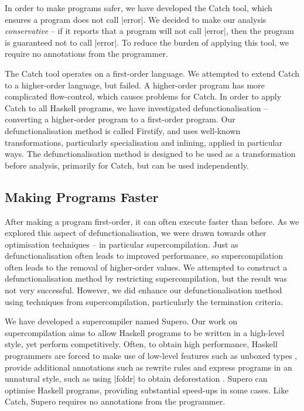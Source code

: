 In order to make programs safer, we have developed the Catch tool, which ensures a program does not call |error|. We decided to make our analysis \textit{conservative} -- if it reports that a program will not call |error|, then the program is guaranteed not to call |error|. To reduce the burden of applying this tool, we require no annotations from the programmer.

The Catch tool operates on a first-order language. We attempted to extend Catch to a higher-order language, but failed. A higher-order program has more complicated flow-control, which causes problems for Catch. In order to apply Catch to all Haskell programs, we have investigated defunctionalisation -- converting a higher-order program to a first-order program. Our defunctionalisation method is called Firstify, and uses well-known transformations, particularly specialisation and inlining, applied in particular ways. The defunctionalisation method is designed to be used as a transformation before analysis, primarily for Catch, but can be used independently.

\subsection{Making Programs Faster}

After making a program first-order, it can often execute faster than before. As we explored this aspect of defunctionalisation, we were drawn towards other optimisation techniques -- in particular supercompilation. Just as defunctionalisation often leads to improved performance, so supercompilation often leads to the removal of higher-order values. We attempted to construct a defunctionalisation method by restricting supercompilation, but the result was not very successful. However, we did enhance our defunctionalisation method using techniques from supercompilation, particularly the termination criteria.

We have developed a supercompiler named Supero. Our work on supercompilation aims to allow Haskell programs to be written in a high-level style, yet perform competitively. Often, to obtain high performance, Haskell programmers are forced to make use of low-level features such as unboxed types \cite{spj:unboxing}, provide additional annotations such as rewrite rules \cite{spj:rules} and express programs in an unnatural style, such as using |foldr| to obtain deforestation \cite{gill:shortcut_deforestation}. Supero can optimise Haskell programs, providing substantial speed-ups in some cases. Like Catch, Supero requires no annotations from the programmer.

